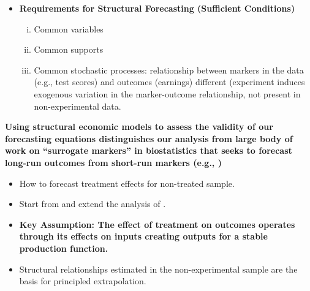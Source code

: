 \documentclass[static]{JJH-Beamer}
\begin{document}
\begin{frame}

\begin{itemize}
\item \textbf{Requirements for Structural Forecasting (Sufficient Conditions)}
    \begin{enumerate}[(i)]
    \item Common variables
    \item Common supports
    \item Common stochastic processes: relationship between markers in the data (e.g., test scores) and outcomes (earnings) different (experiment induces exogenous variation in the marker-outcome relationship, not present in non-experimental data.
    \end{enumerate}
\end{itemize}

\end{frame}

\begin{frame}

\begin{center}
\textbf{Using structural economic models to assess the validity of our forecasting equations distinguishes our analysis from large body of work on ``surrogate markers'' in biostatistics that seeks to forecast long-run outcomes from short-run markers (e.g., \citealp{Prentice_1989_Surrogate_SiM,Hui-Little_2003_Penalized-Spline})}
\end{center}

\end{frame}

\begin{frame}

\begin{itemize}
\item How to forecast treatment effects for non-treated sample.
\item Start from and extend the analysis of \citet{Heckman_Pinto_etal_2013_PerryFactor}.
\item \textbf{Key Assumption: The effect of treatment on outcomes operates through its effects on inputs creating outputs for a stable production function.}
\item Structural relationships estimated in the non-experimental sample are the basis for principled extrapolation.
\end{itemize}

\end{frame}
\end{document}
